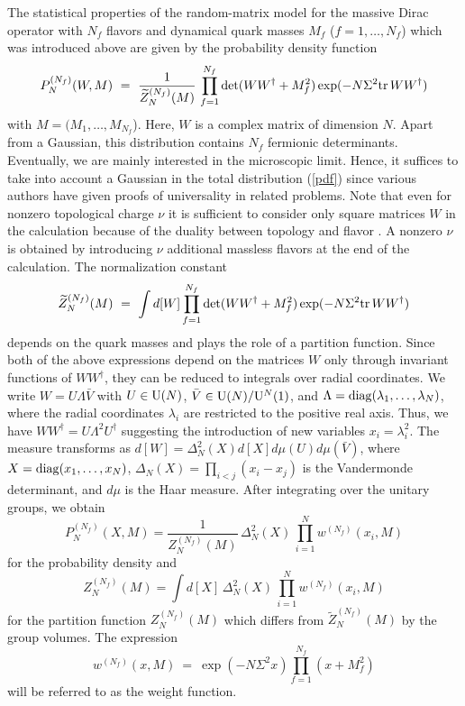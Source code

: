 The statistical properties of the random-matrix model for the massive
Dirac operator with $N_f$ flavors and dynamical quark masses $M_f$
($f=1,\ldots,N_f$) which was introduced above are given by the
probability density function
\begin{equation}
P_N^{(N_f)}(W,M) \ = \ \frac{1}{\widetilde{Z}_N^{(N_f)}(M)} \, 
                \prod_{f=1}^{N_f}\det(WW^\dagger+M_f^2)
                \exp(-N\Sigma^2{{\rm tr}\,} WW^\dagger)
\label{pdf}
\end{equation}
with $M=(M_1,\ldots,M_{N_f}$). Here, $W$ is a complex matrix of
dimension $N$.  Apart from a Gaussian, this distribution contains
$N_f$ fermionic determinants. Eventually, we are mainly interested in
the microscopic limit. Hence, it suffices to take into account a
Gaussian in the total distribution (\ref{pdf}) since various authors
\cite{Brez96,Nish96} have given proofs of universality in related
problems.  Note that even for nonzero topological charge $\nu$ it is
sufficient to consider only square matrices $W$ in the calculation
because of the duality between topology and flavor
\cite{Verb93,Verb94a}.  A nonzero $\nu$ is obtained by introducing
$\nu$ additional massless flavors at the end of the calculation.  The
normalization constant
\begin{equation}
\widetilde{Z}_N^{(N_f)}(M) \ = \ 
               \int d[W] \prod_{f=1}^{N_f}\det(WW^\dagger+M_f^2)
                \exp(-N\Sigma^2{{\rm tr}\,} WW^\dagger)
\label{partf}
\end{equation}
depends on the quark masses and plays the role of a partition
function.  Since both of the above expressions depend on the matrices
$W$ only through invariant functions of $WW^\dagger$, they can be
reduced to integrals over radial coordinates. We write $W=U \Lambda
\bar{V}$ with $U\in{\rm U}(N)$, $\bar{V}\in{\rm U}(N)/ {\rm U}^N(1)$,
and $\Lambda={\rm diag}(\lambda_1,\ldots,\lambda_N)$, where the radial
coordinates $\lambda_i$ are restricted to the positive real axis.
Thus, we have $WW^\dagger=U\Lambda^2U^\dagger$ suggesting the
introduction of new variables $x_i=\lambda_i^2$. The measure
transforms as $d[W]=\Delta_N^2(X)d[X]d\mu(U)d\mu(\bar{V})$, where
$X={\rm diag} (x_1,\ldots,x_N)$, $\Delta_N(X)=\prod_{i<j}(x_i-x_j)$ is
the Vandermonde determinant, and $d\mu$ is the Haar measure.  After
integrating over the unitary groups, we obtain
\begin{equation}
\label{eq2.1}
P_N^{(N_f)}(X,M) = \frac{1}{Z_N^{(N_f)}(M)} \, \Delta_N^2(X) \, 
                 \prod_{i=1}^N w^{(N_f)}(x_i,M) 
\end{equation}
for the probability density and 
\begin{equation}
Z_N^{(N_f)}(M) = \int d[X] \, \Delta_N^2(X) \,
                 \prod_{i=1}^N w^{(N_f)}(x_i,M) 
\label{pdpfx}
\end{equation}
for the partition function $Z_N^{(N_f)}(M)$ which differs from
$\widetilde{Z}_N^{(N_f)}(M)$ by the group volumes. The expression
\begin{equation}
w^{(N_f)}(x,M) \ = \ \exp(-N\Sigma^2x) \prod_{f=1}^{N_f}(x+M_f^2) 
\label{weight}
\end{equation}
will be referred to as the weight function.

